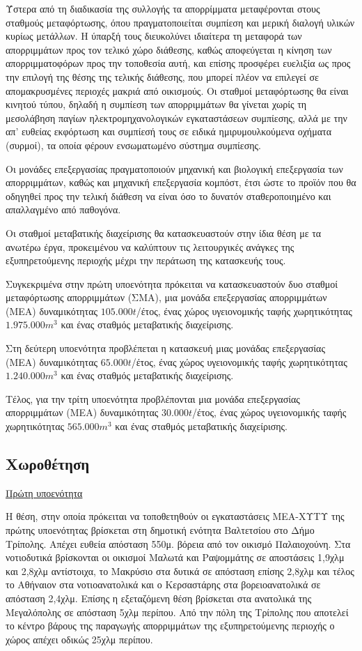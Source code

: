 \documentclass[12pt]{article}
\begin{document}
	Ύστερα από τη διαδικασία της συλλογής τα απορρίμματα μεταφέρονται στους σταθμούς μεταφόρτωσης, όπου πραγματοποιείται συμπίεση και μερική διαλογή υλικών κυρίως μετάλλων. Η ύπαρξή τους διευκολύνει ιδιαίτερα τη μεταφορά των απορριμμάτων προς τον τελικό χώρο διάθεσης, καθώς αποφεύγεται η κίνηση των απορριμματοφόρων προς την τοποθεσία αυτή, και επίσης προσφέρει ευελιξία ως προς την επιλογή της θέσης της τελικής διάθεσης, που μπορεί πλέον να επιλεγεί σε απομακρυσμένες περιοχές μακριά από οικισμούς. Οι σταθμοί μεταφόρτωσης θα είναι κινητού τύπου, δηλαδή η συμπίεση των απορριμμάτων θα γίνεται χωρίς τη μεσολάβηση παγίων ηλεκτρομηχανολογικών εγκαταστάσεων συμπίεσης, αλλά με την απ’ ευθείας εκφόρτωση και συμπίεσή τους σε ειδικά ημιρυμουλκούμενα οχήματα (συρμοί), τα οποία φέρουν ενσωματωμένο σύστημα συμπίεσης.   
	
	Οι μονάδες επεξεργασίας πραγματοποιούν μηχανική και βιολογική επεξεργασία των απορριμμάτων, καθώς και μηχανική επεξεργασία κομπόστ, έτσι ώστε το προϊόν που θα οδηγηθεί προς την τελική διάθεση να είναι όσο το δυνατόν σταθεροποιημένο και απαλλαγμένο από παθογόνα.
	
	Οι σταθμοί μεταβατικής διαχείρισης θα κατασκευαστούν στην ίδια θέση με τα ανωτέρω έργα, προκειμένου να καλύπτουν τις λειτουργικές ανάγκες της εξυπηρετούμενης περιοχής μέχρι την περάτωση της κατασκευής τους.
	
	Συγκεκριμένα στην πρώτη υποενότητα πρόκειται να κατασκευαστούν δυο σταθμοί μεταφόρτωσης απορριμμάτων (ΣΜΑ), μια μονάδα επεξεργασίας απορριμμάτων (ΜΕΑ) δυναμικότητας $105.000 t$/έτος, ένας χώρος υγειονομικής ταφής χωρητικότητας $1.975.000 m^3$ και ένας σταθμός μεταβατικής διαχείρισης.
	
	Στη δεύτερη υποενότητα προβλέπεται η κατασκευή μιας μονάδας επεξεργασίας (ΜΕΑ) δυναμικότητας $65.000 t$/έτος, ένας χώρος υγειονομικής ταφής χωρητικότητας $1.240.000 m^3$ και ένας σταθμός μεταβατικής διαχείρισης.
	
	Τέλος, για την τρίτη υποενότητα προβλέπονται μια μονάδα επεξεργασίας απορριμμάτων (ΜΕΑ) δυναμικότητας $30.000 t$/έτος, ένας χώρος υγειονομικής ταφής χωρητικότητας $565.000 m^3$ και ένας σταθμός μεταβατικής διαχείρισης.
	
	\subsection{Χωροθέτηση}
	
	\underline{Πρώτη υποενότητα}
	
	Η θέση, στην οποία πρόκειται να τοποθετηθούν οι εγκαταστάσεις ΜΕΑ-ΧΥΤΥ  της πρώτης υποενότητας βρίσκεται στη δημοτική ενότητα Βαλτετσίου στο Δήμο Τρίπολης. Απέχει ευθεία απόσταση 550μ. βόρεια από τον οικισμό Παλαιοχούνη. Στα νοτιοδυτικά βρίσκονται οι οικισμοί Μαλωτά και Ραψομμάτης σε αποστάσεις 1,9χλμ και 2,8χλμ αντίστοιχα, το Μακρύσιο στα δυτικά σε απόσταση επίσης 2,8χλμ και τέλος το Αθήναιον στα νοτιοανατολικά και ο Κερσαστάρης στα βορειοανατολικά σε απόσταση 2,4χλμ. Επίσης η εξεταζόμενη θέση βρίσκεται στα ανατολικά της Μεγαλόπολης σε απόσταση 5χλμ περίπου. Από την πόλη της Τρίπολης που αποτελεί το κέντρο βάρους της παραγωγής απορριμμάτων της εξυπηρετούμενης περιοχής ο χώρος απέχει οδικώς 25χλμ περίπου.
	
\end{document}
